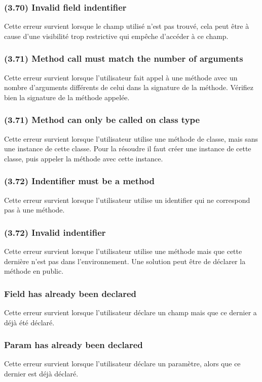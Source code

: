 \documentclass[12pt, a4paper, one side]{article}
\begin{document}
    \subsubsection{(3.70) Invalid field indentifier}
    Cette erreur survient lorsque le champ utilisé n'est pas trouvé, cela peut être à cause d'une visibilité trop restrictive qui empêche d'accéder à ce champ.

    \subsubsection{(3.71) Method call must match the number of arguments}
    Cette erreur survient lorsque l'utilisateur fait appel à une méthode avec un nombre d'arguments différents de celui dans la signature de la méthode. Vérifiez bien la signature de la méthode appelée.

    \subsubsection{(3.71) Method can only be called on class type}
    Cette erreur survient lorsque l'utilisateur utilise une méthode de classe, mais sans une instance de cette classe. Pour la résoudre il faut créer une instance de cette classe, puis appeler la méthode avec cette instance.

    \subsubsection{(3.72) Indentifier must be a method}
    Cette erreur survient lorsque l'utilisateur utilise un identifier qui ne correspond pas à une méthode.

    \subsubsection{(3.72) Invalid indentifier}
    Cette erreur survient lorsque l'utilisateur utilise une méthode mais que cette dernière n'est pas dans l'environnement. Une solution peut être de déclarer la méthode en public.

    \subsubsection{Field has already been declared}
    Cette erreur survient lorsque l'utilisateur déclare un champ mais que ce dernier a déjà été déclaré.

    \subsubsection{Param has already been declared}
    Cette erreur survient lorsque l'utilisateur déclare un paramètre, alors que ce dernier est déjà déclaré.
\end{document}
